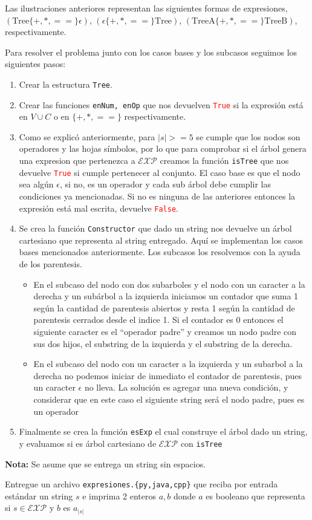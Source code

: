\documentclass[letterpaper,10pt,table, dvipsnames]{article}
\begin{document}
Las ilustraciones anteriores representan las siguientes formas de expresiones, $(\textrm{Tree} \{+,*,==\} \epsilon)$, $(\epsilon \{+,*,==\} \textrm{Tree})$, $(\textrm{TreeA} \{+,*,==\} \textrm{TreeB})$, respectivamente. 

Para resolver el problema junto con los casos bases y los subcasos seguimos los siguientes pasos:

\begin{enumerate}
  \item Crear la estructura \texttt{Tree}.
  \item Crear las funciones \texttt{enNum, enOp} que nos devuelven \textcolor{red}{\texttt{True}} si la expresión está en $V\cup C$ o en $\{+,*,==\}$ respectivamente.
  \item Como se explicó anteriormente, para $|s|>=5$ se cumple que los nodos son operadores y las hojas símbolos, por lo que para comprobar si el árbol genera una expresion que pertenezca a $\mathcal{EXP}$ creamos la función \texttt{isTree} que nos devuelve \textcolor{red}{\texttt{True}} si cumple pertenecer al conjunto. El caso base es que el nodo sea algún $\epsilon$, si no,  es un operador y cada sub árbol debe cumplir las condiciones ya mencionadas. Si no es ninguna de las anteriores entonces la expresión está mal escrita, devuelve \textcolor{red}{\texttt{False}}.
  \item Se crea la función \texttt{Constructor} que dado un string nos devuelve un árbol cartesiano que representa al string entregado. Aquí se implementan los casos bases mencionados anteriormente. Los subcasos los resolvemos con la ayuda de los parentesis. 
  \begin{itemize}
     \item En el subcaso del nodo con dos subarboles y el nodo con un caracter a la derecha y un subárbol a la izquierda iniciamos un contador que suma 1 según la cantidad de parentesis abiertos y resta 1 según la cantidad de parentesis cerrados desde el indice 1. Si el contador es 0 entonces el siguiente caracter es el ``operador padre'' y creamos un nodo padre con sus dos hijos, el substring de la izquierda y el substring de la derecha.
     \item En el subcaso del nodo con un caracter a la izquierda y un subarbol a la derecha no podemos iniciar de inmediato el contador de parentesis, pues un caracter $\epsilon$ no lleva. La solución es agregar una nueva condición, y considerar que en este caso el siguiente string será el nodo padre, pues es un operador
   \end{itemize} 
  \item Finalmente se crea la función \texttt{esExp} el cual construye el árbol dado un string, y evaluamos si es árbol cartesiano de $\mathcal{EXP}$ con \texttt{isTree}
\end{enumerate}

\textbf{Nota:} Se asume que se entrega un string sin espacios.

\begin{tcolorbox}
 Entregue un archivo \texttt{expresiones.\{py,java,cpp\}} que reciba por entrada estándar un string $s$ e imprima 2 enteros $a,b$ donde $a$ es booleano que representa si $s \in \mathcal{EXP}$ y $b$ es $a_{|s|}$
\end{tcolorbox}
\end{document}
